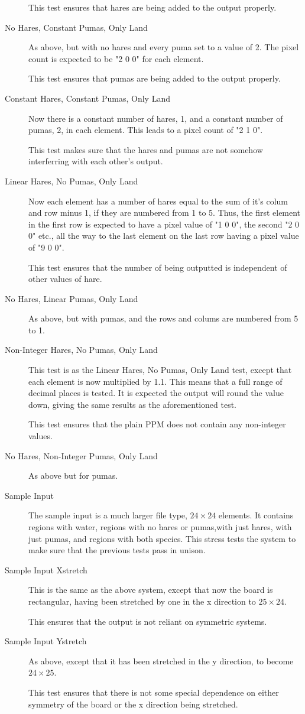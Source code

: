 \begin{description}
			This test ensures that hares are being added to the output properly.
		\item[No Hares, Constant Pumas, Only Land]
			As above, but with no hares and every puma set to a value of 2.
			The pixel count is expected to be "2 0 0" for each element.

			This test ensures that pumas are being added to the output properly.
		\item[Constant Hares, Constant Pumas, Only Land]
			Now there is a constant number of hares, 1, and a constant number of pumas, 2, in each element.
			This leads to a pixel count of "2 1 0".
			
			This test makes sure that the hares and pumas are not somehow interferring with each other's output.
		\item[Linear Hares, No Pumas, Only Land]
			Now each element has a number of hares equal to the sum of it's colum and row minus 1, if they are numbered from 1 to 5.
			Thus, the first element in the first row is expected to have a pixel value of "1 0 0", the second "2 0 0" etc., all the way to the last element on the last row having a pixel value of "9 0 0".

			This test ensures that the number of being outputted is independent of other values of hare.
		\item[No Hares, Linear Pumas, Only Land]
			As above, but with pumas, and the rows and colums are numbered from 5 to 1.
		\item[Non-Integer Hares, No Pumas, Only Land]
			This test is as the Linear Hares, No Pumas, Only Land test, except that each element is now multiplied by 1.1.
			This means that a full range of decimal places is tested.
			It is expected the output will round the value down, giving the same results as the aforementioned test.

			This test ensures that the plain PPM does not contain any non-integer values.
		\item[No Hares, Non-Integer Pumas, Only Land]
			As above but for pumas.
		\item[Sample Input]
			The sample input is a much larger file type, $24\times24$ elements.
			It  contains regions with water, regions with no hares or pumas,with just hares, with just pumas, and regions with both species.
			This stress tests the system to make sure that the previous tests pass in unison.
		\item[Sample Input Xstretch]
			This is the same as the above system, except that now the board is rectangular, having been stretched by one in the x direction to $25\times24$.

			This ensures that the output is not reliant on symmetric systems.
		\item[Sample Input Ystretch]
			As above, except that it has been stretched in the y direction, to become $24\times25$.
			
			This test ensures that there is not some special dependence on either symmetry of the board or the x direction being stretched.
	\end{description}
